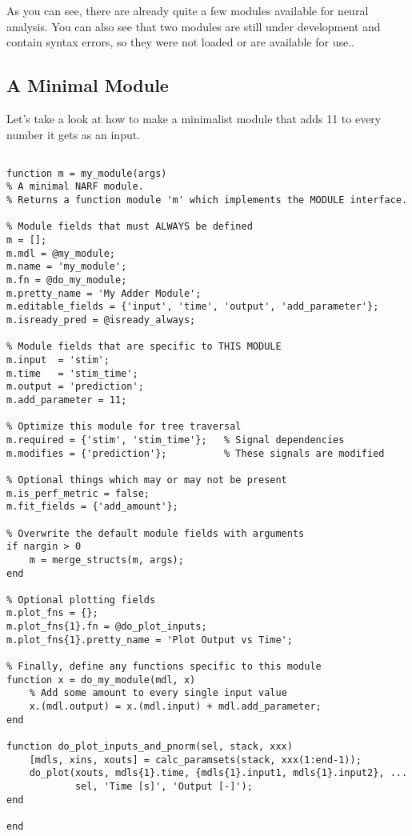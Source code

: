 \documentclass[letterpaper]{report}
\begin{document}
As you can see, there are already quite a few modules available for neural analysis. You can also see that two modules are still under development and contain syntax errors, so they were not loaded or are available for use.. 

\subsection{A Minimal Module}

Let's take a look at how to make a minimalist module that adds 11 to every number it gets as an input. 

\begin{verbatim}

function m = my_module(args)
% A minimal NARF module. 
% Returns a function module 'm' which implements the MODULE interface.

% Module fields that must ALWAYS be defined
m = [];
m.mdl = @my_module;
m.name = 'my_module';
m.fn = @do_my_module;
m.pretty_name = 'My Adder Module';
m.editable_fields = {'input', 'time', 'output', 'add_parameter'};
m.isready_pred = @isready_always;

% Module fields that are specific to THIS MODULE
m.input  = 'stim';
m.time   = 'stim_time';
m.output = 'prediction';
m.add_parameter = 11;

% Optimize this module for tree traversal  
m.required = {'stim', 'stim_time'};   % Signal dependencies
m.modifies = {'prediction'};          % These signals are modified

% Optional things which may or may not be present
m.is_perf_metric = false;
m.fit_fields = {'add_amount'};

% Overwrite the default module fields with arguments 
if nargin > 0
    m = merge_structs(m, args);
end

% Optional plotting fields
m.plot_fns = {};
m.plot_fns{1}.fn = @do_plot_inputs;
m.plot_fns{1}.pretty_name = 'Plot Output vs Time';

% Finally, define any functions specific to this module
function x = do_my_module(mdl, x)   
    % Add some amount to every single input value
    x.(mdl.output) = x.(mdl.input) + mdl.add_parameter;
end

function do_plot_inputs_and_pnorm(sel, stack, xxx)
    [mdls, xins, xouts] = calc_paramsets(stack, xxx(1:end-1)); 
    do_plot(xouts, mdls{1}.time, {mdls{1}.input1, mdls{1}.input2}, ...
            sel, 'Time [s]', 'Output [-]');
end

end
\end{verbatim}
\end{document}
